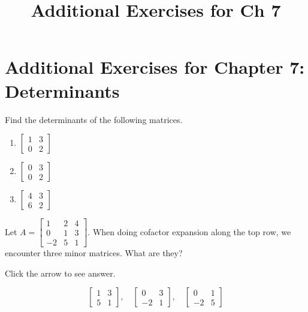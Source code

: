 \documentclass{ximera}
\title{Additional Exercises for Ch 7} \license{CC BY-NC-SA 4.0}
\begin{document}
\begin{abstract}
\end{abstract}
\maketitle

\section*{Additional Exercises for Chapter 7: Determinants}

\begin{problem}\label{prb:7.1} Find the determinants of the following matrices.

\begin{enumerate}
\item $\left[
\begin{array}{rr}
1 & 3 \\
0 & 2
\end{array}
\right]$

\item $\left[
\begin{array}{rr}
0 & 3 \\
0 & 2
\end{array}
\right]$

\item $\left[
\begin{array}{rr}
4 & 3 \\
6 & 2
\end{array}
\right]$
\end{enumerate}
\end{problem}

\begin{problem}\label{prb:7.2} Let $A = \left[ \begin{array}{rrr}
1 & 2 & 4 \\
0 & 1 & 3 \\
-2 & 5 & 1
\end{array} \right]$. When doing cofactor expansion along the top row, we encounter three minor matrices.  What are they?

Click the arrow to see answer.
\begin{expandable}
$$\begin{bmatrix}1&3\\5&1\end{bmatrix},\quad\begin{bmatrix}0&3\\-2&1\end{bmatrix},\quad\begin{bmatrix}0&1\\-2&5\end{bmatrix}$$
\end{expandable}
\end{problem}
\end{document}
